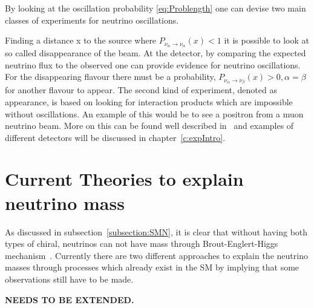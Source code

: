 By looking at the oscillation probability \eqref{eq:Problength} one can devise two main classes of experiments for neutrino oscillations.

Finding a distance x to the source where $P_{\nu_\alpha \rightarrow \nu_\alpha} (x) < 1$ it is possible to look at so called disappearance of the beam. At the detector, by comparing the expected neutrino flux to the observed one can provide evidence for neutrino oscillations. For the disappearing flavour there must be a probability, $P_{\nu_\alpha \rightarrow \nu_\beta} (x) > 0, \alpha=\beta$ for another flavour to appear. The second kind of experiment, denoted as appearance, is based on looking for interaction products which are impossible without oscillations. An example of this would be to see a positron from a muon neutrino beam. More on this can be found well described in~\cite{34doi:10.1142/9789812562203_0002} and examples of different detectors will be discussed in chapter~\ref{c:expIntro}.

\section{Current Theories to explain neutrino mass}
As discussed in subsection~\ref{subsection:SMN}, it is clear that without having both types of chiral, neutrinos can not have mass through Brout\hyp{}Englert\hyp{}Higgs mechanism~\cite{35Higgs}. Currently there are two different approaches to explain the neutrino masses through processes which already exist in the SM by implying that some observations still have to be made.

\textbf{NEEDS TO BE EXTENDED.}



